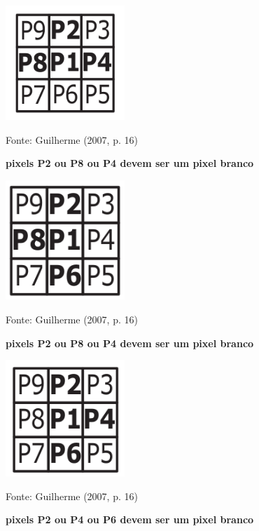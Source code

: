 \documentclass[
	12pt,				%
	oneside,			%
	a4paper,			%
	english,			%
	french,				%
	spanish,			%
	brazil,				%
	]{abntex2}
\begin{document}
\begin{figure}[ht]
\centering
\caption{\textbf{pixels P2 ou P8 ou P4 devem ser um pixel branco}}
\includegraphics[width=0.4\textwidth]{imagens/zhangsuen1.png}

Fonte: Guilherme (2007, p. 16)
\label{fig:zhangsuen1}
\end{figure}


\begin{figure}[ht]
\centering
\caption{\textbf{pixels P2 ou P8 ou P4 devem ser um pixel branco}}
\includegraphics[width=0.4\textwidth]{imagens/zhangsuen2.png}

Fonte: Guilherme (2007, p. 16)
\label{fig:zhangsuen2}
\end{figure}

\begin{figure}[ht]
\centering
\caption{\textbf{pixels P2 ou P4 ou P6 devem ser um pixel branco}}
\includegraphics[width=0.4\textwidth]{imagens/zhangsuen3.png}

Fonte: Guilherme (2007, p. 16)
\label{fig:zhangsuen3}
\end{figure}
\end{document}
